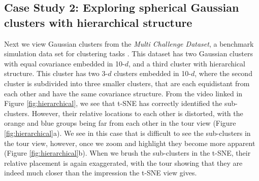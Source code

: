 \documentclass[article,notitle]{jdssv}
\begin{document}
\hypertarget{case-study-2-exploring-spherical-gaussian-clusters-with-hierarchical-structure}{%
\subsection{Case Study 2: Exploring spherical Gaussian clusters with hierarchical structure}\label{case-study-2-exploring-spherical-gaussian-clusters-with-hierarchical-structure}}

Next we view Gaussian clusters from the
\emph{Multi Challenge Dataset}, a benchmark simulation data set for clustering tasks
\citep{Rauber2009-vh}. This dataset has two Gaussian clusters with equal covariance
embedded in 10-\(d\), and a third cluster
with hierarchical structure. This cluster has two 3-\(d\) clusters embedded in
10-\(d\), where the second cluster is subdivided into three smaller clusters,
that are each equidistant from each other and have the same covariance structure.
From the video linked in Figure \ref{fig:hierarchical}, we see
that t-SNE has correctly identified the sub-clusters. However, their relative
locations to each other is distorted, with the orange and blue groups being
far from each other in the tour view (Figure \ref{fig:hierarchical}a). We see
in this case that is difficult
to see the sub-clusters in the tour view, however, once we zoom and highlight
they become more apparent (Figure \ref{fig:hierarchical}b). When we brush
the sub-clusters in the t-SNE, their
relative placement is again exaggerated, with the tour showing that they
are indeed much closer than the impression the t-SNE view gives.
\end{document}
